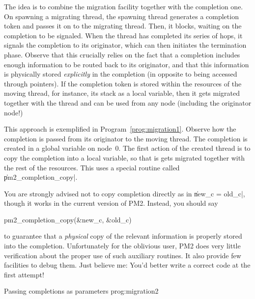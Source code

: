 The idea is to combine the migration facility together with the
completion one. On spawning a migrating thread, the spawning thread
generates a completion token and passes it on to the migrating thread.
Then, it blocks, waiting on the completion to be signaled. When the
thread has completed its series of hops, it signals the completion to
its originator, which can then initiates the termination phase.
Observe that this crucially relies on the fact that a completion
includes enough information to be routed back to its originator, and
that this information is physically stored \emph{explicitly} in the
completion (in opposite to being accessed through pointers).  If the
completion token is stored within the resources of the moving thread,
for instance, its stack as a local variable, then it gets migrated
together with the thread and can be used from any node (including the
originator node!)

This approach is exemplified in Program~\ref{prog:migration1}. Observe
how the completion is passed from its originator to the moving thread.
The completion is created in a global variable on node~0. The first
action of the created thread is to copy the completion into a local
variable, so that is gets migrated together with the rest of the
resources. This uses a special routine called \|pm2_completion_copy|.

\begin{warning}
  You are strongly advised not to copy completion directly as in
  \|new_c = old_c|, though it works in the current version of PM2.
  Instead, you should say 
\begin{program}
pm2_completion_copy(&new_c, &old_c)
\end{program}
to guarantee that a \emph{physical} copy of the relevant information
is properly stored into the completion.  Unfortunately for the
oblivious user, PM2 does very little verification about the proper use
of such auxiliary routines. It also provide few facilities to debug
them.  Just believe me: You'd better write a correct code at the first
attempt!
\end{warning}

 {Passing completions as
  parameters} {prog:migration2}

